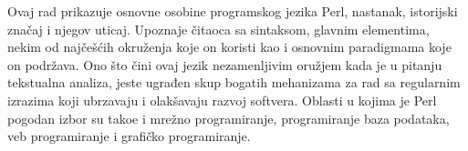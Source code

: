 \documentclass[a4paper]{article}
\begin{document}
Ovaj rad prikazuje osnovne osobine programskog jezika Perl, nastanak, istorijski značaj i njegov uticaj. Upoznaje \v citaoca sa sintaksom, glavnim elementima, nekim od naj\v ce\v s\'cih okru\v zenja koje on koristi kao i osnovnim paradigmama koje on podržava. Ono što čini ovaj jezik nezamenljivim oružjem kada je u pitanju tekstualna analiza, jeste ugrađen skup bogatih mehanizama za rad sa regularnim izrazima koji ubrzavaju i olakšavaju razvoj softvera. Oblasti u kojima je Perl pogodan izbor su tako\dj{}e i mrežno programiranje, programiranje baza podataka, veb programiranje i grafičko programiranje. 


\appendix
 

\end{document}

